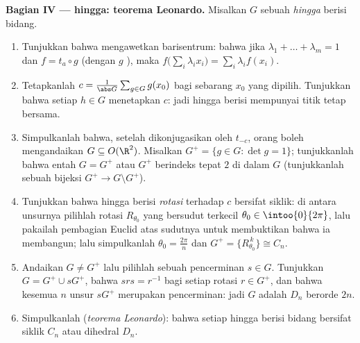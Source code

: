 \begin{problem}
\medskip
\noindent\textbf{Bagian IV ---  hingga: teorema Leonardo.}
Misalkan $G$ sebuah  \emph{hingga} berisi  bidang.
\begin{enumerate}[resume]
  \item Tunjukkan bahwa  mengawetkan barisentrum: bahwa jika
        $\lambda_1 + \dots + \lambda_m = 1$ dan $f = t_a \circ
        g$ (dengan $g$ ), maka $f\bigl(\sum_i \lambda_i
        x_i\bigr) = \sum_i \lambda_i f(x_i)$.
  \item Tetapkanlah $c = \frac{1}{\abs G}\sum_{g \in G} g(x_0)$ bagi sebarang
        $x_0$ yang dipilih. Tunjukkan bahwa setiap $h \in G$ menetapkan $c$:
        jadi  hingga berisi  mempunyai titik tetap bersama.
  \item Simpulkanlah bahwa, setelah dikonjugasikan oleh $t_{-c}$, orang boleh
        mengandaikan $G \subseteq O(\R^2)$. Misalkan $G^{+} = \{g \in G :
        \det g = 1\}$; tunjukkanlah bahwa entah $G = G^{+}$ atau $G^{+}$
        berindeks tepat $2$ di dalam $G$ (tunjukkanlah sebuah bijeksi $G^+
        \to G \setminus G^+$).
  \item Tunjukkan bahwa  hingga berisi \emph{rotasi} terhadap $c$
        bersifat siklik: di antara unsurnya pilihlah rotasi
        $R_{\theta_0}$ yang bersudut terkecil $\theta_0 \in
        \intoo{0}{2\pi}$, lalu pakailah pembagian Euclid atas sudutnya
        untuk membuktikan bahwa ia membangun; lalu simpulkanlah $\theta_0 =
        \frac{2\pi}n$ dan $G^{+} = \{R_{\theta_0}^{\,k}\} \cong
        C_n$.
  \item Andaikan $G \neq G^{+}$ lalu pilihlah sebuah pencerminan $s \in G$.
        Tunjukkan $G = G^{+} \cup sG^{+}$, bahwa $s r s = r^{-1}$ bagi
        setiap rotasi $r \in G^{+}$, dan bahwa kesemua $n$ unsur
        $sG^{+}$ merupakan pencerminan: jadi $G$ adalah \emph{} $D_n$ berorde $2n$.
  \item Simpulkanlah (\emph{teorema Leonardo}): bahwa setiap  hingga
        berisi  bidang bersifat siklik $C_n$ atau dihedral
        $D_n$.
\end{enumerate}


\end{problem}
